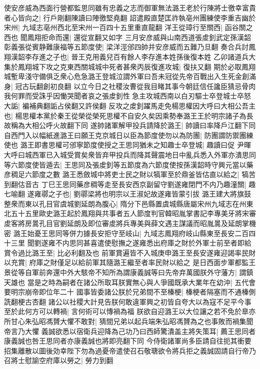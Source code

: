 使安彦威為西面行營都監思同雖有忠義之志而御軍無法潞王老於行陳將士徼幸富貴者心皆向之|{
	行戶剛翻陳讀曰陣徼堅堯翻}
詔遣殿直楚匡祚執亳州團練使李重吉幽於宋州|{
	九域志亳州西北至宋州一百四十五里重直龍翻}
洋王從璋行至關西|{
	函谷關之西也}
聞鳳翔拒命而還|{
	還從宣翻又如字}
三月安彦威與山南西道張䖍釗武定孫漢韶彰義張從賓静難康福等五節度使|{
	梁洋涇邠四帥并安彦威而五難乃旦翻}
奏合兵討鳳翔漢韶李存進之子也|{
	晉王克用義兒百有餘人李存進本姓孫後復本姓}
乙卯諸道兵大集於鳳翔城下攻之克東西關城城中死者甚衆丙辰復進攻城|{
	復扶又翻}
期於必取鳳翔城塹卑淺守備俱乏衆心危急潞王登城泣謂外軍曰吾未冠從先帝百戰出入生死金創滿身|{
	冠古玩翻創初良翻}
以立今日之社稷汝曹從我目睹其事今朝廷信任讒臣猜忌骨肉我何罪而受誅乎因慟哭聞者哀之張䖍釗性急主攻城西南以白刃驅士卒登城士卒怒大詬|{
	褊補典翻詬占侯翻又許侯翻}
反攻之䖍釗躍馬走免楊思權因大呼曰大相公吾主也|{
	楊思權本黨於秦王從榮從榮死思權不自安久矣因乘勢奉潞王王於明宗諸子為長故稱為大相公呼火故翻下同}
遂帥諸軍解甲投兵請降於潞王|{
	帥讀曰率降戶江翻下同}
自西門入以幅紙進潞王曰願王克京城日以臣為節度使勿以為防團|{
	防團謂防禦團練使也}
潞王即書思權可邠寧節度使授之王思同猶未之知趣士卒登城|{
	趣讀曰促}
尹暉大呼曰城西軍已入城受賞矣衆皆弃甲投兵而降其聲震地日中亂兵悉入外軍亦潰思同等六節度使皆遁去|{
	王思同及張䖍釗等五節度為六節度使按孫漢韶時守興元當以藥彦稠足六節度之數}
潞王悉斂城中將吏士民之財以犒軍至於鼎釜皆估直以給之|{
	犒苦到翻估音古}
丁巳王思同藥彦稠等走至長安西京副留守劉遂雍閉門不内乃趣潼關|{
	趣七喻翻}
遂雍鄩之子也|{
	劉鄩梁將也明宗以王淑妃故遂雍皆蒙引拔}
潞王建大將旗鼓整衆而東以孔目官虞城劉延朗為腹心|{
	隋分下邑縣置虞城縣唐屬宋州九域志在州東北五十五里歐史潞王起於鳳翔與共事者五人節度判官韓昭胤掌書記李專美牙將宋審䖍客將房暠孔目官劉延朗及即位審䖍將兵專美與薛文遇主謀議而昭胤暠及延朗掌機密}
潞王始憂王思同等併力據長安拒守至岐山|{
	九域志鳳翔府岐山縣東至長安二百四十三里}
聞劉遂雍不内思同甚喜遣使慰撫之遂雍悉出府庫之財於外軍士前至者即給賞令過比潞王至|{
	比必利翻及也}
前軍賞遍皆不入城庚申潞王至長安遂雍迎謁率民財以充賞|{
	府庫之財僅足以給前軍其隨潞王繼至者率民財以給之}
是日西面步軍都監王景從等自軍前奔還中外大駭帝不知所為謂康義誠等曰先帝弃萬國朕外守藩方|{
	謂鎮天雄也}
當是之時為嗣者在諸公所取耳朕實無心與人爭國既承大業年在幼沖|{
	五代會要明宗崩帝即位年二十}
國事皆委諸公朕於兄弟間不至榛梗|{
	榛梗者隔塞而不通榛側詵翻梗古杏翻}
諸公以社稷大計見告朕何敢違軍興之初皆自夸大以為寇不足平今事至於此何方可以轉禍|{
	言何術可以慱禍為福}
朕欲自迎潞王以大位讓之若不免於臯亦所甘心朱弘昭馮贇大懼不敢對|{
	猜間兄弟以起兵端朱弘昭馮贇為之也事敗而禍集聞帝言乃大懼}
義誠欲悉以宿衛兵迎降為己功乃曰西師驚潰盖主將失策耳|{
	薦王思同者康義誠也咎王思同者亦康義誠也將即亮翻下同}
今侍衛諸軍尚多臣請自往扼其衝要招集離散以圖後効幸陛下勿為過憂帝遣使召石敬瑭欲令將兵拒之義誠固請自行帝乃召將士慰諭空府庫以勞之|{
	勞力到翻}
